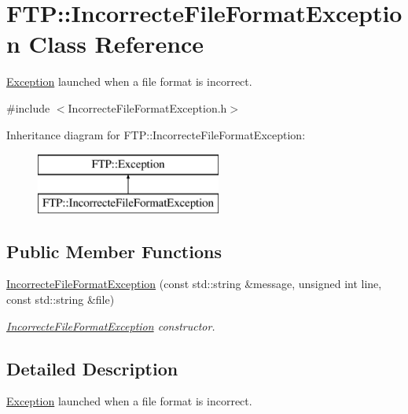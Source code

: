 \hypertarget{classFTP_1_1IncorrecteFileFormatException}{}\section{F\+T\+P\+:\+:Incorrecte\+File\+Format\+Exception Class Reference}
\label{classFTP_1_1IncorrecteFileFormatException}


\hyperlink{classFTP_1_1Exception}{Exception} launched when a file format is incorrect.  




{\ttfamily \#include $<$Incorrecte\+File\+Format\+Exception.\+h$>$}

Inheritance diagram for F\+T\+P\+:\+:Incorrecte\+File\+Format\+Exception\+:\begin{figure}[H]
\begin{center}
\leavevmode
\includegraphics[height=2.000000cm]{classFTP_1_1IncorrecteFileFormatException}
\end{center}
\end{figure}
\subsection*{Public Member Functions}
\begin{DoxyCompactItemize}
\item 
\hyperlink{classFTP_1_1IncorrecteFileFormatException_a0ade738f890878daee4f89a1447cb590}{Incorrecte\+File\+Format\+Exception} (const std\+::string \&message, unsigned int line, const std\+::string \&file)
\begin{DoxyCompactList}\small\item\em \hyperlink{classFTP_1_1IncorrecteFileFormatException}{Incorrecte\+File\+Format\+Exception} constructor. \end{DoxyCompactList}\end{DoxyCompactItemize}


\subsection{Detailed Description}
\hyperlink{classFTP_1_1Exception}{Exception} launched when a file format is incorrect. 

